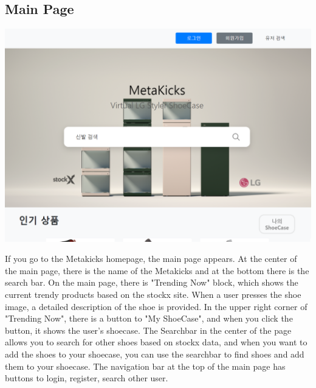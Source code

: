 \documentclass[conference]{IEEEtran}
\begin{document}
\subsection{Main Page}
\centerline{\includegraphics[scale=0.3]{pics/main_page.png}}
If you go to the Metakicks homepage, the main page appears. At the center of the main page, there is the name of  the Metakicks and at the bottom there is the search bar. On the main page, there is "Trending Now" block, which shows the current trendy products based on the stockx site. When a user presses the shoe image, a detailed description of the shoe is provided. In the upper right corner of "Trending Now", there is a button to "My ShoeCase", and when you click the button, it shows the user's shoecase. The Searchbar in the center of the page allows you to search for other shoes based on stockx data, and when you want to add the shoes to your shoecase, you can use the searchbar to find shoes and add them to your shoecase. The navigation bar at the top of the main page has buttons to login, register, search other user.\\\\
\end{document}
